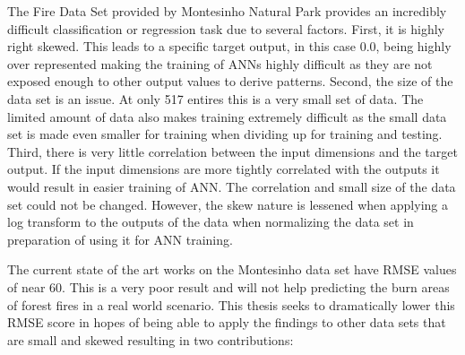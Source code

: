 
The Fire Data Set provided by Montesinho Natural Park provides an incredibly difficult classification or regression task due to several factors. First, it is highly right skewed. This leads to a specific target output, in this case 0.0, being highly over represented making the training of ANNs highly difficult as they are not exposed enough to other output values to derive patterns. Second, the size of the data set is an issue. At only 517 entires this is a very small set of data. The limited amount of data also makes training extremely difficult as the small data set is made even smaller for training when dividing up for training and testing. Third, there is very little correlation between the input dimensions and the target output. If the input dimensions are more tightly correlated with the outputs it would result in easier training of ANN. The correlation and small size of the data set could not be changed. However, the skew nature is lessened when applying a log transform to the outputs of the data when normalizing the data set in preparation of using it for ANN training.

The current state of the art works on the Montesinho data set have RMSE values of near 60. This is a very poor result and will not help predicting the burn areas of forest fires in a real world scenario. This thesis seeks to dramatically lower this RMSE score in hopes of being able to apply the findings to other data sets that are small and skewed resulting in two contributions:

